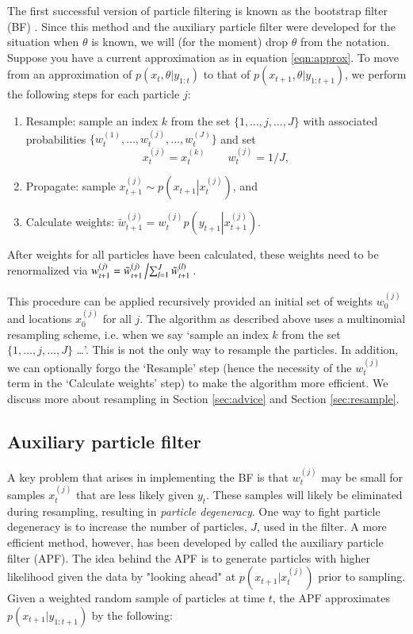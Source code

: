 \documentclass{elsarticle}
\begin{document}
The first successful version of particle filtering is known as the bootstrap filter (BF) \citep{Gord:Salm:Smit:nove:1993}. Since this method and the auxiliary particle filter were developed for the situation when $\theta$ is known, we will (for the moment) drop $\theta$ from the notation. Suppose you have a current approximation as in equation \eqref{eqn:approx}. To move from an approximation of $p(x_t,\theta| y_{1:t})$ to that of $p(x_{t+1},\theta| y_{1:t+1})$, we perform the following steps for each particle $j$:

\begin{enumerate}
\item Resample: sample an index $k$ from the set $\{1,\ldots,j,\ldots,J\}$ with associated probabilities $\{w_t^{(1)},\ldots,w_t^{(j)},\ldots,w_t^{(J)}\}$ and set
    \[ x_t^{(j)} = x_t^{(k)} \qquad w_t^{(j)} = 1 / J, \]
\item Propagate: sample $x_{t+1}^{(j)} \sim p\left(\left. x_{t+1}\right|x_t^{(j)}\right)$, and
\item Calculate weights: $\tilde{w}_{t+1}^{(j)} = w_t^{(j)}p\left(y_{t+1}\left|x_{t+1}^{(j)}\right.\right)$.
\end{enumerate}

\noindent After weights for all particles have been calculated, these weights need to be renormalized via $w_{t+1}^{(j)} = \tilde{w}_{t+1}^{(j)}\left/ \sum_{l=1}^J \tilde{w}_{t+1}^{(l)} \right.$.

This procedure can be applied recursively provided an initial set of weights $w_0^{(j)}$ and locations $x_0^{(j)}$ for all $j$. The algorithm as described above uses a multinomial resampling scheme, i.e. when we say `sample an index $k$ from the set $\{1,\ldots,j,\ldots,J\}$ \ldots'. This is not the only way to resample the particles. In addition, we can optionally forgo the `Resample' step (hence the necessity of the $w_t^{(j)}$ term in the `Calculate weights' step) to make the algorithm more efficient. We discuss more about resampling in Section \ref{sec:advice} and Section \ref{sec:resample}.

\subsection{Auxiliary particle filter \label{sec:apf}}

A key problem that arises in implementing the BF is that $w_t^{(j)}$ may be small for samples $x_t^{(j)}$ that are less likely given $y_t$. These samples will likely be eliminated during resampling, resulting in \emph{particle degeneracy}. One way to fight particle degeneracy is to increase the number of particles, $J$, used in the filter. A more efficient method, however, has been developed by \citet{Pitt:Shep:filt:1999} called the auxiliary particle filter (APF). The idea behind the APF is to generate particles with higher likelihood given the data by "looking ahead" at $p(x_{t+1}|x_t^{(j)})$ prior to sampling. Given a weighted random sample of particles at time $t$, the APF approximates $p(x_{t+1}|y_{1:t+1})$ by the following:
\end{document}
